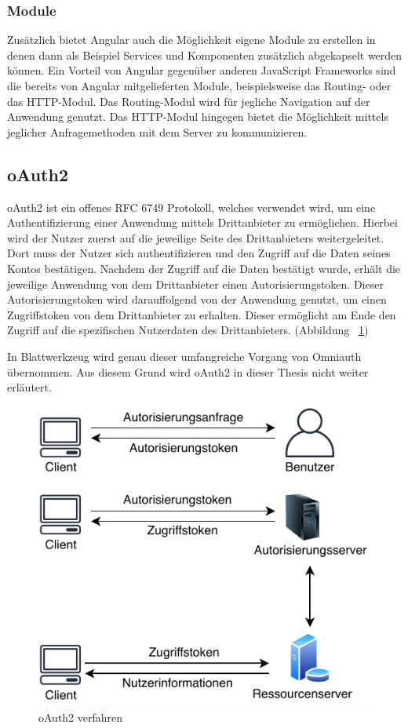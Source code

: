 \subsubsection{Module}
\label{sec: ang-modul}
Zusätzlich bietet Angular auch die Möglichkeit eigene Module zu erstellen in denen dann als Beispiel Services und Komponenten zusätzlich abgekapselt werden können. Ein Vorteil von Angular gegenüber anderen JavaScript Frameworks sind die bereits von Angular mitgelieferten Module, beispielsweise das Routing- oder das HTTP-Modul. Das Routing-Modul wird für jegliche Navigation auf der Anwendung genutzt. Das \gls{HTTP}-Modul hingegen bietet die Möglichkeit mittels jeglicher Anfragemethoden mit dem Server zu kommunizieren.

\subsection{oAuth2}
\label{sec: oauth2}
\gls{oAuth2} ist ein offenes \gls{RFC} 6749 Protokoll, welches verwendet wird, um eine Authentifizierung einer Anwendung mittels Drittanbieter zu ermöglichen. Hierbei wird der Nutzer zuerst auf die jeweilige Seite des Drittanbieters weitergeleitet. Dort muss der Nutzer sich authentifizieren und den Zugriff auf die Daten seines Kontos bestätigen. Nachdem der Zugriff auf die Daten bestätigt wurde, erhält die jeweilige Anwendung von dem Drittanbieter einen Autorisierungstoken. Dieser Autorisierungstoken wird darauffolgend von der Anwendung genutzt, um einen Zugriffstoken von dem Drittanbieter zu erhalten. Dieser ermöglicht am Ende den Zugriff auf die spezifischen Nutzerdaten des Drittanbieters. (Abbildung ~\ref{fig:oauth2})

In Blattwerkzeug wird genau dieser umfangreiche Vorgang von Omniauth übernommen. Aus diesem Grund wird oAuth2 in dieser Thesis nicht weiter erläutert.

\begin{figure}[h]
	\centering
	\includegraphics[width=.55\textwidth]{graphics/oauth2.pdf}
	\caption{oAuth2 verfahren}
	\label{fig:oauth2}
\end{figure}
